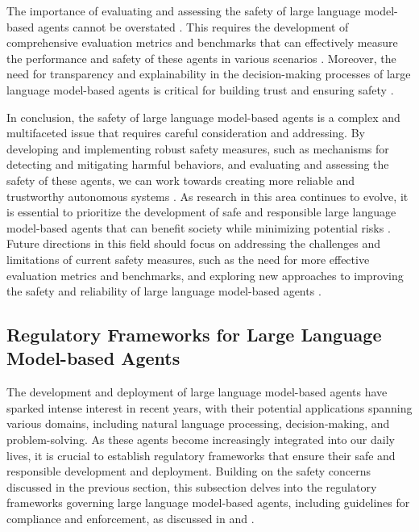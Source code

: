 \documentclass[11pt,a4paper]{article}
\begin{document}
The importance of evaluating and assessing the safety of large language model-based agents cannot be overstated \cite{arxiv:2308.04026}. This requires the development of comprehensive evaluation metrics and benchmarks that can effectively measure the performance and safety of these agents in various scenarios \cite{arxiv:2308.05960}. Moreover, the need for transparency and explainability in the decision-making processes of large language model-based agents is critical for building trust and ensuring safety \cite{arxiv:2306.03917}.

In conclusion, the safety of large language model-based agents is a complex and multifaceted issue that requires careful consideration and addressing. By developing and implementing robust safety measures, such as mechanisms for detecting and mitigating harmful behaviors, and evaluating and assessing the safety of these agents, we can work towards creating more reliable and trustworthy autonomous systems \cite{doi:10.1109/mwc.016.2300600}. As research in this area continues to evolve, it is essential to prioritize the development of safe and responsible large language model-based agents that can benefit society while minimizing potential risks \cite{doi:10.18653/v1/2023.findings-emnlp.461}. Future directions in this field should focus on addressing the challenges and limitations of current safety measures, such as the need for more effective evaluation metrics and benchmarks, and exploring new approaches to improving the safety and reliability of large language model-based agents \cite{arxiv:2410.06153}.


\subsection{Regulatory Frameworks for Large Language Model-based Agents}


The development and deployment of large language model-based agents have sparked intense interest in recent years, with their potential applications spanning various domains, including natural language processing, decision-making, and problem-solving. As these agents become increasingly integrated into our daily lives, it is crucial to establish regulatory frameworks that ensure their safe and responsible development and deployment. Building on the safety concerns discussed in the previous section, this subsection delves into the regulatory frameworks governing large language model-based agents, including guidelines for compliance and enforcement, as discussed in \cite{doi:10.1145/3748302} and \cite{doi:10.1145/3712003}.
\end{document}

